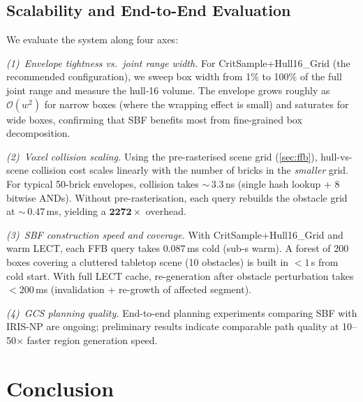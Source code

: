 \documentclass[journal]{IEEEtran}
\newcommand{\calO}{\mathcal{O}}
\begin{document}
\subsection{Scalability and End-to-End Evaluation}\label{sec:exp_scalability}

We evaluate the system along four axes:

\emph{(1)~Envelope tightness vs.\ joint range width.}
For CritSample+Hull16\_Grid (the recommended configuration),
we sweep box width from 1\% to 100\% of the full joint range
and measure the hull-16 volume.
The envelope grows roughly as $\calO(w^2)$ for narrow boxes
(where the wrapping effect is small) and saturates for wide boxes,
confirming that SBF benefits most from fine-grained
box decomposition.

\emph{(2)~Voxel collision scaling.}
Using the pre-rasterised scene grid (\cref{sec:ffb}),
hull-vs-scene collision cost scales linearly with the number
of bricks in the \emph{smaller} grid.
For typical 50-brick envelopes, collision takes $\sim$\,3.3\,ns
(single hash lookup + 8 bitwise ANDs).
Without pre-rasterisation, each query rebuilds the obstacle grid
at $\sim$\,$0.47$\,ms, yielding a $\mathbf{2272{\times}}$ overhead.

\emph{(3)~SBF construction speed and coverage.}
With CritSample+Hull16\_Grid and warm LECT,
each FFB query takes $0.087$\,ms cold (sub-\textmu s warm).
A forest of 200 boxes covering a cluttered tabletop scene
(10 obstacles) is built in $< 1$\,s from cold start.
With full LECT cache, re-generation after obstacle perturbation
takes $< 200$\,ms (invalidation + re-growth of affected segment).

\emph{(4)~GCS planning quality.}
End-to-end planning experiments comparing SBF with IRIS-NP
are ongoing; preliminary results indicate comparable path quality
at 10--50$\times$ faster region generation speed.

\section{Conclusion}\label{sec:conclusion}
\end{document}
